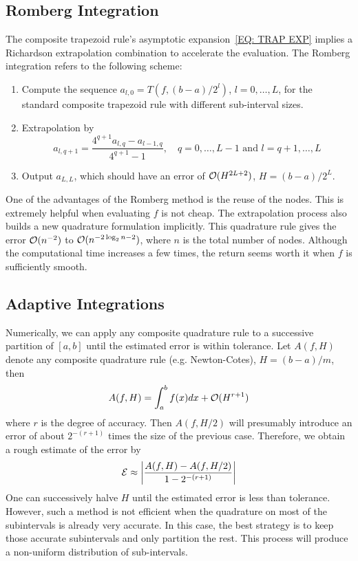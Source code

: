 \subsection{Romberg Integration}
\label{SSec: 3-ROM-INT}
The composite trapezoid rule's asymptotic expansion~\eqref{EQ: TRAP EXP} implies a Richardson extrapolation combination to accelerate the evaluation. The Romberg integration refers to the following scheme: 
\begin{enumerate}
    \item Compute the sequence $a_{l, 0} = T(f, (b-a)/2^l)$, $l=0,\dots, L$, for the standard composite trapezoid rule with different sub-interval sizes. 
    \item Extrapolation by 
    $$a_{l, q+1} = \frac{4^{q+1} a_{l, q} - a_{l-1, q}}{4^{q+1} - 1}, \quad q = 0,\dots, L-1 \text{ and } l = q+1,\dots, L$$
    \item Output $a_{L,L}$, which should have an error of $\mathcal O(H^{2L+2})$, $H = (b-a)/2^L$.
\end{enumerate}
\begin{remark}
    One of the advantages of the Romberg method is the reuse of the nodes. This is extremely helpful when evaluating $f$ is not cheap. The extrapolation process also builds a new quadrature formulation implicitly. This quadrature rule gives the error $\mathcal O(n^{-2})$ to $\mathcal O(n^{-2\log_2 n-2})$, where $n$ is the total number of nodes. Although the computational time increases a few times, the return seems worth it when $f$ is sufficiently smooth.
\end{remark}
\subsection{Adaptive Integrations}
Numerically, we can apply any composite quadrature rule to a successive partition of $[a, b]$ until the estimated error is within tolerance. Let $A(f, H)$ denote any composite quadrature rule (e.g. Newton-Cotes), $H = (b-a)/m$, then 
\begin{equation}
    A(f, H) = \int_a^b f(x) dx + \mathcal O(H^{r+1})
\end{equation}
where $r$ is the degree of accuracy. Then $A(f, H/2)$ will presumably introduce an error of about $2^{-(r+1)}$ times the size of the previous case. Therefore, we obtain a rough estimate of the error by
$$\mathcal E \approx \left|\frac{A(f, H) - A(f, H/2)}{1 - 2^{-(r+1)}}\right|$$
One can successively halve $H$ until the estimated error is less than tolerance. However, such a method is not efficient when the quadrature on most of the subintervals is already very accurate. In this case, the best strategy is to keep those accurate subintervals and only partition the rest. This process will produce a non-uniform distribution of sub-intervals. 

